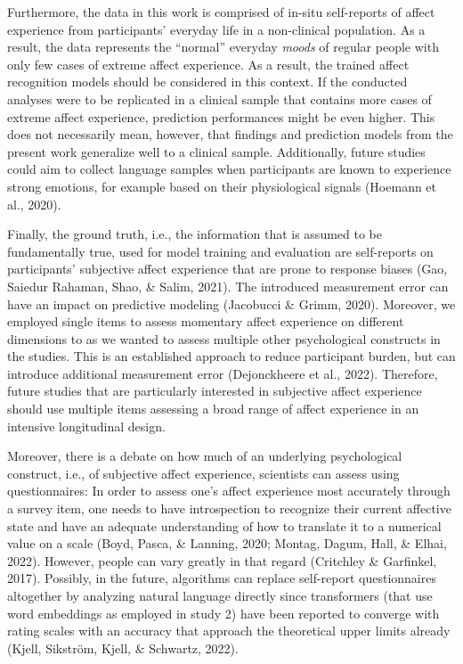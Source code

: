 \documentclass[
  english,
  man,floatsintext]{apa6}
\begin{document}
Furthermore, the data in this work is comprised of in-situ self-reports of affect experience from participants' everyday life in a non-clinical population. As a result, the data represents the ``normal'' everyday \emph{moods} of regular people with only few cases of extreme affect experience. As a result, the trained affect recognition models should be considered in this context. If the conducted analyses were to be replicated in a clinical sample that contains more cases of extreme affect experience, prediction performances might be even higher. This does not necessarily mean, however, that findings and prediction models from the present work generalize well to a clinical sample. Additionally, future studies could aim to collect language samples when participants are known to experience strong emotions, for example based on their physiological signals (Hoemann et al., 2020).

Finally, the ground truth, i.e., the information that is assumed to be fundamentally true, used for model training and evaluation are self-reports on participants' subjective affect experience that are prone to response biases (Gao, Saiedur Rahaman, Shao, \& Salim, 2021). The introduced measurement error can have an impact on predictive modeling (Jacobucci \& Grimm, 2020). Moreover, we employed single items to assess momentary affect experience on different dimensions to as we wanted to assess multiple other psychological constructs in the studies. This is an established approach to reduce participant burden, but can introduce additional measurement error (Dejonckheere et al., 2022). Therefore, future studies that are particularly interested in subjective affect experience should use multiple items assessing a broad range of affect experience in an intensive longitudinal design.

Moreover, there is a debate on how much of an underlying psychological construct, i.e., of subjective affect experience, scientists can assess using questionnaires: In order to assess one's affect experience most accurately through a survey item, one needs to have introspection to recognize their current affective state and have an adequate understanding of how to translate it to a numerical value on a scale (Boyd, Pasca, \& Lanning, 2020; Montag, Dagum, Hall, \& Elhai, 2022). However, people can vary greatly in that regard (Critchley \& Garfinkel, 2017). Possibly, in the future, algorithms can replace self-report questionnaires altogether by analyzing natural language directly since transformers (that use word embeddings as employed in study 2) have been reported to converge with rating scales with an accuracy that approach the theoretical upper limits already (Kjell, Sikström, Kjell, \& Schwartz, 2022).
\end{document}
